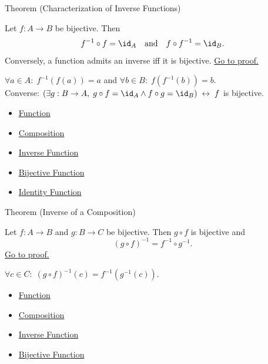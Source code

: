 \begin{theorembox}{Theorem (Characterization of Inverse Functions)}
\begin{theorem}\label{thm:inverse-char}
Let $f : A \to B$ be bijective. Then
\[
f^{-1} \circ f = \id_A
\quad\text{and}\quad
f \circ f^{-1} = \id_B.
\]
Conversely, a function admits an inverse iff it is bijective.
\hyperref[prf:inverse-char]{Go to proof.}
\end{theorem}
\end{theorembox}

\begin{remark*}
$\forall a \in A:\; f^{-1}(f(a)) = a$ and $\forall b \in B:\; f(f^{-1}(b)) = b$.\\
Converse: $(\exists g: B\to A,\; g\circ f = \id_A \wedge f\circ g = \id_B) \;\leftrightarrow\; f$ is bijective.
\end{remark*}

\begin{dependencies}
\begin{itemize}
  \item \hyperref[def:function]{Function}
  \item \hyperref[def:composition]{Composition}
  \item \hyperref[def:inverse]{Inverse Function}
  \item \hyperref[def:bijective]{Bijective Function}
  \item \hyperref[def:identity]{Identity Function}
\end{itemize}
\end{dependencies}

\begin{theorembox}{Theorem (Inverse of a Composition)}
\begin{theorem}\label{thm:inverse-comp}
Let $f : A \to B$ and $g : B \to C$ be bijective. Then $g \circ f$ is
bijective and
\[
(g \circ f)^{-1} = f^{-1} \circ g^{-1}.
\]
\hyperref[prf:inverse-comp]{Go to proof.}
\end{theorem}
\end{theorembox}

\begin{remark*}
$\forall c \in C:\; (g \circ f)^{-1}(c) = f^{-1}(g^{-1}(c))$.
\end{remark*}

\begin{dependencies}
\begin{itemize}
  \item \hyperref[def:function]{Function}
  \item \hyperref[def:composition]{Composition}
  \item \hyperref[def:inverse]{Inverse Function}
  \item \hyperref[def:bijective]{Bijective Function}
\end{itemize}
\end{dependencies}

